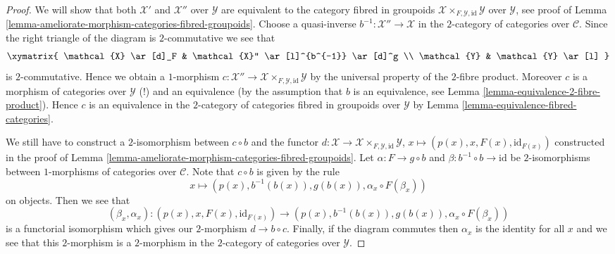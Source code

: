 \begin{proof}
We will show that both $\mathcal{X}'$ and $\mathcal{X}''$ over $\mathcal{Y}$
are equivalent to the category fibred in groupoids
$\mathcal{X} \times_{F, \mathcal{Y}, \text{id}} \mathcal{Y}$
over $\mathcal{Y}$, see proof of
Lemma \ref{lemma-ameliorate-morphism-categories-fibred-groupoids}.
Choose a quasi-inverse $b^{-1} : \mathcal{X}'' \to \mathcal{X}$ in the
$2$-category of categories over $\mathcal{C}$.
Since the right triangle of the diagram is $2$-commutative we see that
$$
\xymatrix{
\mathcal{X} \ar[d]_F & \mathcal{X}'' \ar[l]^{b^{-1}} \ar[d]^g \\
\mathcal{Y} & \mathcal{Y} \ar[l]
}
$$
is $2$-commutative. Hence we obtain a $1$-morphism
$c : \mathcal{X}'' \to
\mathcal{X} \times_{F, \mathcal{Y}, \text{id}} \mathcal{Y}$
by the universal property of the $2$-fibre product. Moreover $c$
is a morphism of categories over $\mathcal{Y}$ (!) and an equivalence
(by the assumption that $b$ is an equivalence, see
Lemma \ref{lemma-equivalence-2-fibre-product}).
Hence $c$ is an equivalence in the $2$-category of categories fibred
in groupoids over $\mathcal{Y}$ by
Lemma \ref{lemma-equivalence-fibred-categories}.

\medskip\noindent
We still have to construct a $2$-isomorphism between $c \circ b$ and
the functor $d : \mathcal{X} \to
\mathcal{X} \times_{F, \mathcal{Y}, \text{id}} \mathcal{Y}$,
$x \mapsto (p(x), x, F(x), \text{id}_{F(x)})$
constructed in the proof of
Lemma \ref{lemma-ameliorate-morphism-categories-fibred-groupoids}.
Let $\alpha : F \to g \circ b$ and $\beta : b^{-1} \circ b \to \text{id}$
be $2$-isomorphisms between $1$-morphisms of categories over $\mathcal{C}$.
Note that $c \circ b$ is given by the rule
$$
x \mapsto (p(x), b^{-1}(b(x)), g(b(x)), \alpha_x \circ F(\beta_x))
$$
on objects. Then we see that
$$
(\beta_x, \alpha_x) :
(p(x), x, F(x), \text{id}_{F(x)})
\longrightarrow
(p(x), b^{-1}(b(x)), g(b(x)), \alpha_x \circ F(\beta_x))
$$
is a functorial isomorphism which gives our $2$-morphism
$d \to b \circ c$. Finally, if the diagram commutes then
$\alpha_x$ is the identity for all $x$ and we see that this
$2$-morphism is a $2$-morphism in the $2$-category of categories
over $\mathcal{Y}$.
\end{proof}


































